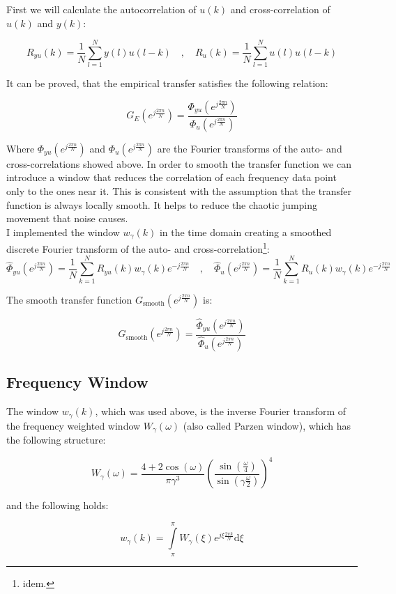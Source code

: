 First we will calculate the autocorrelation of $u(k)$ and cross-correlation of $u(k)$ and $y(k)$:

\[R_{yu}(k) = \frac{1}{N}\sum\limits_{l = 1}^N y(l)u(l-k) \quad , \quad R_{u}(k) = \frac{1}{N}\sum\limits_{l = 1}^N u(l)u(l-k)\]

It can be proved, that the empirical transfer satisfies the following relation: 

\[G_E(e^{j\frac{2\pi n}{N}}) = \frac{\Phi_{yu}(e^{j\frac{2\pi n}{N}})}{\Phi_{u}(e^{j\frac{2\pi n}{N}})}\]

Where $\Phi_{yu}(e^{j\frac{2\pi n}{N}})$ and $\Phi_{u}(e^{j\frac{2\pi n}{N}})$ are the Fourier transforms of the auto- and cross-correlations showed above. In order to smooth the transfer function we can introduce a window that reduces the correlation of each frequency data point only to the ones near it. This is consistent with the assumption that the transfer function is always locally smooth. It helps to reduce the chaotic jumping movement that noise causes. \\

I implemented the window $w_\gamma(k)$ in the time domain creating a smoothed discrete Fourier transform of the auto- and cross-correlation\footnote[3]{idem.}:
\[\hat{\Phi}_{yu}(e^{j\frac{2\pi n}{N}}) = \frac{1}{N}\sum\limits_{k = 1}^{N }R_{yu}(k)w_\gamma(k)e^{-j\frac{2\pi n}{N}} \quad, \quad \hat{\Phi}_{u}(e^{j\frac{2\pi n}{N}}) = \frac{1}{N}\sum\limits_{k = 1}^{N }R_{u}(k)w_\gamma(k)e^{-j\frac{2\pi n}{N}}\]

The smooth transfer function $G_\text{smooth}(e^{j\frac{2\pi n}{N}})$ is:


\[G_\text{smooth}(e^{j\frac{2\pi n}{N}}) = \frac{\hat{\Phi}_{yu}(e^{j\frac{2\pi n}{N}})}{\hat{\Phi}_{u}(e^{j\frac{2\pi n}{N}})}\]


\subsection{Frequency Window}

The window $w_\gamma(k)$, which was used above, is the inverse Fourier transform of the frequency weighted window $W_\gamma(\omega)$ (also called Parzen window), which has the following structure:

\[W_\gamma(\omega) = \frac{4+2\cos(\omega)}{\pi \gamma^3}\left( \frac{\sin(\frac{\omega}{4})}{\sin(\gamma\frac{\omega}{2})}\right)^4 \]

and the following holds:

\[w_\gamma(k) = \int\limits_\pi^\pi W_\gamma(\xi)e^{j\xi \frac{2\pi k}{N}}\text{d}\xi\]

